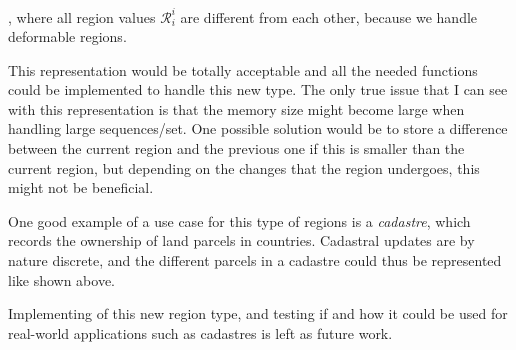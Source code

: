 , where all region values $\mathcal{R}_i^i$ are different from each other, because we handle deformable regions.

This representation would be totally acceptable and all the needed functions could be implemented to handle this new type. The only true issue that I can see with this representation is that the memory size might become large when handling large sequences/set. One possible solution would be to store a difference between the current region and the previous one if this is smaller than the current region, but depending on the changes that the region undergoes, this might not be beneficial.

One good example of a use case for this type of regions is a \textit{cadastre}, which records the ownership of land parcels in countries. Cadastral updates are by nature discrete, and the different parcels in a cadastre could thus be represented like shown above.

Implementing of this new region type, and testing if and how it could be used for real-world applications such as cadastres is left as future work.
